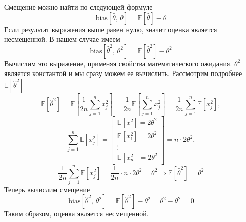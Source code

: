 \documentclass[a4paper, 12pt]{article}
\begin{document}
    Смещение можно найти по следующей формуле $$\text{bias}{\left[\hat{\theta},\,\theta\right]}=\mathbb{E}\left[\hat{\theta}\right]-\theta$$
    Если результат выражения выше равен нулю, значит оценка является несмещенной. В нашем случае имеем
    $$\text{bias}{\left[\hat{\theta}^2,\,\theta^2\right]}=\mathbb{E}\left[\hat{\theta}^2\right]-\theta^2$$
    Вычислим это выражение, применяя свойства математического ожидания. $\theta^2$ является
    константой и мы сразу можем ее вычислить. Рассмотрим подробнее $\mathbb{E}\left[\hat{\theta}^2\right]$
    $$\mathbb{E}\left[\hat{\theta}^2\right]=\mathbb{E}\left[\dfrac{1}{2n}\sum\limits_{j=1}^{n}x_j^2\right]=\dfrac{1}{2n}\mathbb{E}\left[\sum\limits_{j=1}^{n}x_j^2\right]
    =\dfrac{1}{2n}\sum\limits_{j=1}^{n}\mathbb{E}\left[x_j^2\right],$$
    $$\sum\limits_{j=1}^{n}\mathbb{E}\left[x_j^2\right]=
    \begin{bmatrix}
        \mathbb{E}\left[x^2\right]=2\theta^2\\
        \mathbb{E}\left[x_1^2\right]=2\theta^2\\
        \vdots \\
        \mathbb{E}\left[x_n^2\right]=2\theta^2
    \end{bmatrix}=
    n\cdot2\theta^2,
    $$
    $$\dfrac{1}{2n}\sum\limits_{j=1}^{n}\mathbb{E}\left[x_j^2\right]=\dfrac{1}{2n}\cdot n\cdot2\theta^2=\theta^2
    \Rightarrow \mathbb{E}\left[\hat{\theta}^2\right]=\theta^2$$
    Теперь вычислим смещение
    $$\text{bias}{\left[\hat{\theta}^2,\,\theta^2\right]}=\mathbb{E}\left[\hat{\theta}^2\right]-\theta^2=\theta^2-\theta^2=0$$
    Таким образом, оценка является несмещенной.
\end{document}
